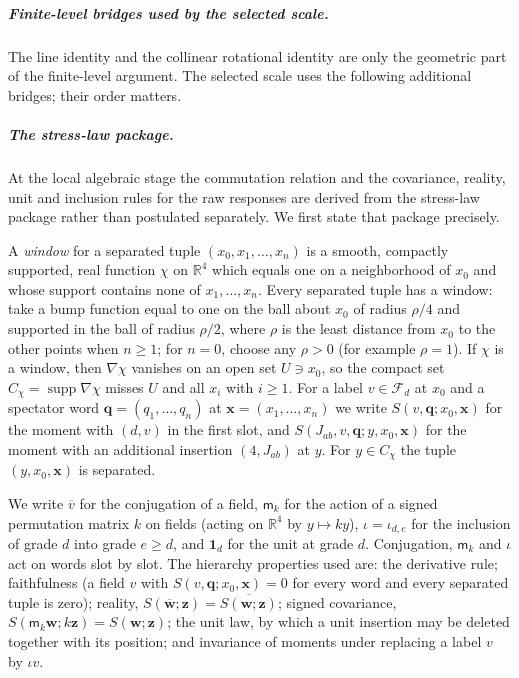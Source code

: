 \subparagraph{Finite-level bridges used by the selected scale.}
The line identity and the collinear rotational identity are only the
geometric part of the finite-level argument.  The selected scale uses the
following additional bridges; their order matters.

\subparagraph{The stress-law package.}
At the local algebraic stage the commutation relation and the covariance,
reality, unit and inclusion rules for the raw responses are derived from
the stress-law package rather than postulated separately.  We first state
that package precisely.

A \emph{window} for a separated tuple $(x_0,x_1,\ldots,x_n)$ is a smooth,
compactly supported, real function $\chi$ on $\mathbb R^4$ which equals
one on a neighborhood of $x_0$ and whose support contains none of
$x_1,\ldots,x_n$.  Every separated tuple has a window: take a bump function
equal to one on the ball about $x_0$ of radius $\rho/4$ and supported in
the ball of radius $\rho/2$, where $\rho$ is the least distance from $x_0$
to the other points when $n\ge1$; for $n=0$, choose any $\rho>0$
(for example $\rho=1$).  If $\chi$ is a window, then $\nabla\chi$ vanishes on
an open set $U\ni x_0$, so the compact set
$C_\chi=\operatorname{supp}\nabla\chi$ misses $U$ and all $x_i$ with
$i\ge1$.  For a label $v\in\mathcal F_d$ at $x_0$ and a spectator word
$\boldsymbol q=(q_1,\ldots,q_n)$ at $\boldsymbol x=(x_1,\ldots,x_n)$ we
write $S(v,\boldsymbol q;x_0,\boldsymbol x)$ for the moment with $(d,v)$
in the first slot, and $S(J_{ab},v,\boldsymbol q;y,x_0,\boldsymbol x)$ for
the moment with an additional insertion $(4,J_{ab})$ at $y$.  For
$y\in C_\chi$ the tuple $(y,x_0,\boldsymbol x)$ is separated.

We write $\overline v$ for the conjugation of a field, $\mathsf m_k$ for
the action of a signed permutation matrix $k$ on fields (acting on
$\mathbb R^4$ by $y\mapsto ky$), $\iota=\iota_{d,e}$ for the inclusion of
grade $d$ into grade $e\ge d$, and $\mathbf 1_d$ for the unit at grade
$d$.  Conjugation, $\mathsf m_k$ and $\iota$ act on words slot by slot.
The hierarchy properties used are: the derivative rule; faithfulness (a
field $v$ with $S(v,\boldsymbol q;x_0,\boldsymbol x)=0$ for every word and
every separated tuple is zero); reality,
$S(\overline{\boldsymbol w};\boldsymbol z)
=\overline{S(\boldsymbol w;\boldsymbol z)}$; signed covariance,
$S(\mathsf m_k\boldsymbol w;k\boldsymbol z)=S(\boldsymbol w;\boldsymbol z)$;
the unit law, by which a unit insertion may be deleted together with its
position; and invariance of moments under replacing a label $v$ by
$\iota v$.

